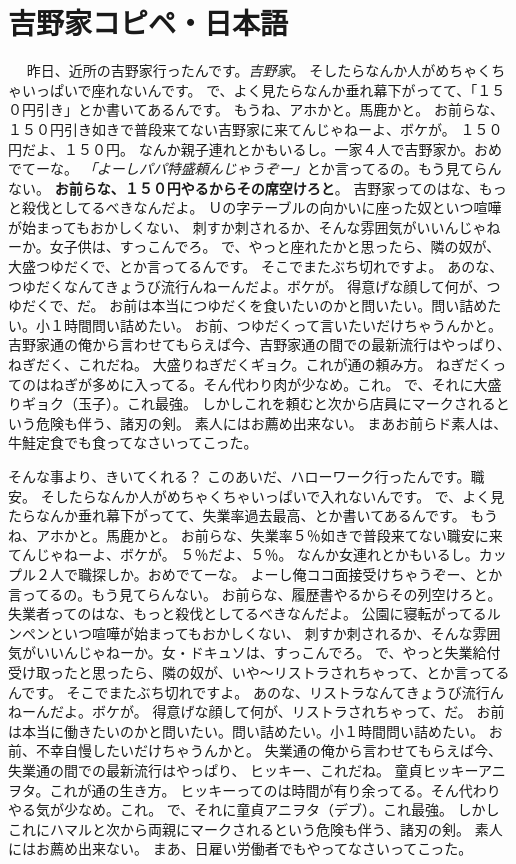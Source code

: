\documentclass[14pt,a4paper]{ltjsarticle}
\begin{document}
\section{吉野家コピペ・日本語}
　
昨日、近所の吉野家行ったんです。\emph{吉野家}。 
そしたらなんか人がめちゃくちゃいっぱいで座れないんです。 
で、よく見たらなんか垂れ幕下がってて、「１５０円引き」とか書いてあるんです。 
もうね、アホかと。馬鹿かと。 
お前らな、１５０円引き如きで普段来てない吉野家に来てんじゃねーよ、ボケが。 
１５０円だよ、１５０円。 
なんか親子連れとかもいるし。一家４人で吉野家か。おめでてーな。 
\emph{「よーしパパ特盛頼んじゃうぞー」}とか言ってるの。もう見てらんない。 
\textbf{お前らな、１５０円やるからその席空けろと}。 
吉野家ってのはな、もっと殺伐としてるべきなんだよ。 
Ｕの字テーブルの向かいに座った奴といつ喧嘩が始まってもおかしくない、 
刺すか刺されるか、そんな雰囲気がいいんじゃねーか。女子供は、すっこんでろ。 
で、やっと座れたかと思ったら、隣の奴が、大盛つゆだくで、とか言ってるんです。 
そこでまたぶち切れですよ。 
あのな、つゆだくなんてきょうび流行んねーんだよ。ボケが。 
得意げな顔して何が、つゆだくで、だ。 
お前は本当につゆだくを食いたいのかと問いたい。問い詰めたい。小１時間問い詰めたい。 
お前、つゆだくって言いたいだけちゃうんかと。 
吉野家通の俺から言わせてもらえば今、吉野家通の間での最新流行はやっぱり、 
ねぎだく、これだね。 
大盛りねぎだくギョク。これが通の頼み方。 
ねぎだくってのはねぎが多めに入ってる。そん代わり肉が少なめ。これ。 
で、それに大盛りギョク（玉子）。これ最強。 
しかしこれを頼むと次から店員にマークされるという危険も伴う、諸刃の剣。 
素人にはお薦め出来ない。 
まあお前らド素人は、牛鮭定食でも食ってなさいってこった。 


そんな事より、きいてくれる？ 
このあいだ、ハローワーク行ったんです。職安。 
そしたらなんか人がめちゃくちゃいっぱいで入れないんです。 
で、よく見たらなんか垂れ幕下がってて、失業率過去最高、とか書いてあるんです。 
もうね、アホかと。馬鹿かと。 
お前らな、失業率５％如きで普段来てない職安に来てんじゃねーよ、ボケが。 
５％だよ、５％。 
なんか女連れとかもいるし。カップル２人で職探しか。おめでてーな。 
よーし俺ココ面接受けちゃうぞー、とか言ってるの。もう見てらんない。 
お前らな、履歴書やるからその列空けろと。 
失業者ってのはな、もっと殺伐としてるべきなんだよ。 
公園に寝転がってるルンペンといつ喧嘩が始まってもおかしくない、 
刺すか刺されるか、そんな雰囲気がいいんじゃねーか。女・ドキュソは、すっこんでろ。 
で、やっと失業給付受け取ったと思ったら、隣の奴が、いや～リストラされちゃって、とか言ってるんです。 
そこでまたぶち切れですよ。 
あのな、リストラなんてきょうび流行んねーんだよ。ボケが。 
得意げな顔して何が、リストラされちゃって、だ。 
お前は本当に働きたいのかと問いたい。問い詰めたい。小１時間問い詰めたい。 
お前、不幸自慢したいだけちゃうんかと。 
失業通の俺から言わせてもらえば今、失業通の間での最新流行はやっぱり、 
ヒッキー、これだね。 
童貞ヒッキーアニヲタ。これが通の生き方。 
ヒッキーってのは時間が有り余ってる。そん代わりやる気が少なめ。これ。 
で、それに童貞アニヲタ（デブ）。これ最強。 
しかしこれにハマルと次から両親にマークされるという危険も伴う、諸刃の剣。 
素人にはお薦め出来ない。 
まあ、日雇い労働者でもやってなさいってこった。 
\end{document}
